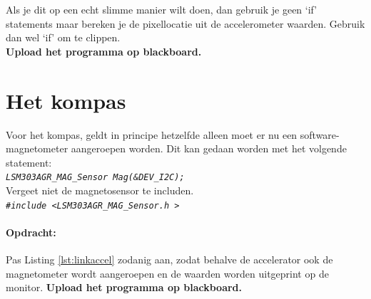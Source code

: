 \begin{enumerate}
Als je dit op een echt slimme manier wilt doen, dan gebruik je geen ‘if’ statements maar bereken je de pixellocatie uit de accelerometer waarden. Gebruik dan wel ‘if’ om te clippen.\\
\textbf{Upload het programma op blackboard.}


\end{enumerate}

\section{Het kompas}

Voor het kompas, geldt in principe hetzelfde alleen moet er nu een software-magnetometer aangeroepen worden. Dit kan gedaan worden met het volgende statement:\\
\texttt{\textit{LSM303AGR\_MAG\_Sensor Mag(\&DEV\_I2C);}}\\
Vergeet niet de magnetosensor te includen.\\
\texttt{\textit{\#include \textless LSM303AGR\_MAG\_Sensor.h \textgreater}}

\paragraph{Opdracht:}
Pas Listing \ref{lst:linkaccel} zodanig aan, zodat behalve de accelerator ook de magnetometer wordt aangeroepen en de waarden worden uitgeprint op de monitor. 
\textbf{Upload het programma op blackboard.}

